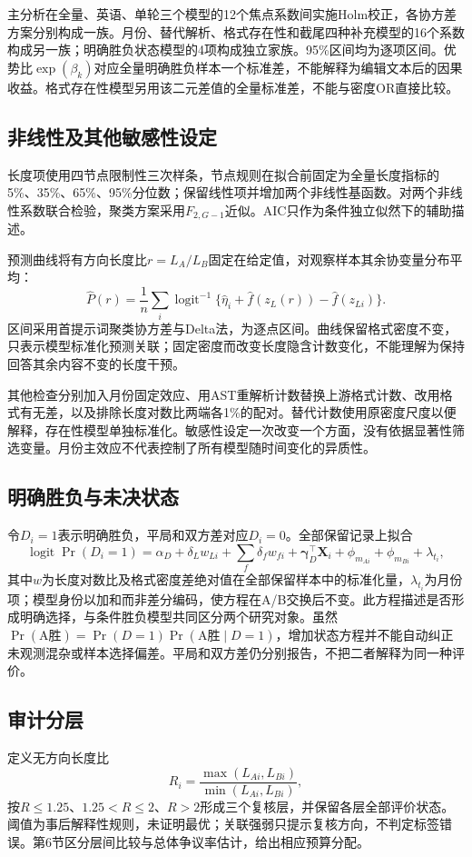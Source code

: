 主分析在全量、英语、单轮三个模型的12个焦点系数间实施Holm校正，各协方差方案分别构成一族。月份、替代解析、格式存在性和截尾四种补充模型的16个系数构成另一族；明确胜负状态模型的4项构成独立家族。95\%区间均为逐项区间。优势比$\exp(\beta_k)$对应全量明确胜负样本一个标准差，不能解释为编辑文本后的因果收益。格式存在性模型另用该二元差值的全量标准差，不能与密度OR直接比较。

\subsection{非线性及其他敏感性设定}
长度项使用四节点限制性三次样条\cite{harrell}，节点规则在拟合前固定为全量长度指标的5\%、35\%、65\%、95\%分位数；保留线性项并增加两个非线性基函数。对两个非线性系数联合检验，聚类方案采用$F_{2,G-1}$近似。AIC只作为条件独立似然下的辅助描述。

预测曲线将有方向长度比$r=L_A/L_B$固定在给定值，对观察样本其余协变量分布平均：
\begin{equation}
 \widehat P(r)=\frac1n\sum_i\operatorname{logit}^{-1}
 \{\widehat\eta_i+\widehat f(z_L(r))-\widehat f(z_{Li})\}.
\end{equation}
区间采用首提示词聚类协方差与Delta法，为逐点区间。曲线保留格式密度不变，只表示模型标准化预测关联；固定密度而改变长度隐含计数变化，不能理解为保持回答其余内容不变的长度干预。

其他检查分别加入月份固定效应、用AST重解析计数替换上游格式计数、改用格式有无差，以及排除长度对数比两端各1\%的配对。替代计数使用原密度尺度以便解释，存在性模型单独标准化。敏感性设定一次改变一个方面，没有依据显著性筛选变量。月份主效应不代表控制了所有模型随时间变化的异质性。

\subsection{明确胜负与未决状态}
令$D_i=1$表示明确胜负，平局和双方差对应$D_i=0$。全部保留记录上拟合
\begin{equation}
 \operatorname{logit}\Pr(D_i=1)=\alpha_D+\delta_Lw_{Li}
 +\sum_f\delta_fw_{fi}+\bm\gamma_D^\top\bm X_i
 +\phi_{m_{Ai}}+\phi_{m_{Bi}}+\lambda_{t_i},
\end{equation}
其中$w$为长度对数比及格式密度差绝对值在全部保留样本中的标准化量，$\lambda_{t_i}$为月份项；模型身份以加和而非差分编码，使方程在A/B交换后不变。此方程描述是否形成明确选择，与条件胜负模型共同区分两个研究对象。虽然$\Pr(\text{A胜})=\Pr(D=1)\Pr(\text{A胜}\mid D=1)$，增加状态方程并不能自动纠正未观测混杂或样本选择偏差。平局和双方差仍分别报告，不把二者解释为同一种评价。

\subsection{审计分层}
定义无方向长度比
\begin{equation}\label{eq:ratio}
 R_i=\frac{\max(L_{Ai},L_{Bi})}{\min(L_{Ai},L_{Bi})},
\end{equation}
按$R\leq1.25$、$1.25<R\leq2$、$R>2$形成三个复核层，并保留各层全部评价状态。阈值为事后解释性规则，未证明最优；关联强弱只提示复核方向，不判定标签错误。第6节区分层间比较与总体争议率估计，给出相应预算分配。
